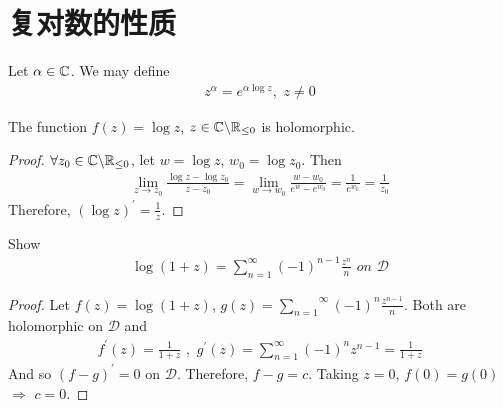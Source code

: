 \newpage
\section{复对数的性质}
Let $\alpha \in \mathbb{C}$. We may define
\begin{align}
	z^\alpha = e^{\alpha \log{z}} , \,\, z \neq 0
\end{align}

\vspace{2em}
\begin{proposition}\label{prop 3.3.1}
	The function $f(z) = \log{z}$, $z \in \mathbb{C} \backslash \mathbb{R}_{\leq 0}$ is holomorphic.
	
	\vspace{2em}
	\begin{proof}
		$\forall z_0 \in \mathbb{C} \backslash \mathbb{R}_{\leq 0}$, let $w = \log{z}$, $w_0 = \log{z_0}$. Then
		\begin{align}
			\lim_{z \to z_0}{\frac{\log{z} - \log{z_0}}{z - z_0}} = \lim_{w \to w_0}{\frac{w - w_0}{e^w - e^{w_0}}} = \frac{1}{e^{w_0}} = \frac{1}{z_0}
		\end{align}
		Therefore, $(\log{z})^{'} = \frac{1}{z}$.
	\end{proof}
\end{proposition}

\vspace{2em}
\begin{proposition}\label{prop 3.3.2}
	Show
	\begin{align}
		\log{(1 + z)} = \sum_{n = 1}^{\infty}{(-1)^{n - 1}\frac{z^n}{n}} \,\, on \,\, \mathcal{D}
	\end{align}
	
	\vspace{2em}
	\begin{proof}
		Let $f(z) = \log{(1 + z)}$, $g(z) = \overset{\infty}{\underset{n = 1}{\sum}}{(-1)^n \frac{z^{n - 1}}{n}}$. Both are holomorphic on $\mathcal{D}$ and
		\begin{align}
			f^{'}(z) = \frac{1}{1 + z} \,\, , \,\, g^{'}(z) = \sum_{n = 1}^{\infty}{(-1)^n z^{n - 1}} = \frac{1}{1 + z}
		\end{align}
		And so $(f - g)^{'} = 0$ on $\mathcal{D}$. Therefore, $f - g = c$. Taking $z = 0$, $f(0) = g(0)$ $\Rightarrow$ $c = 0$.
	\end{proof}
\end{proposition}

\newpage
